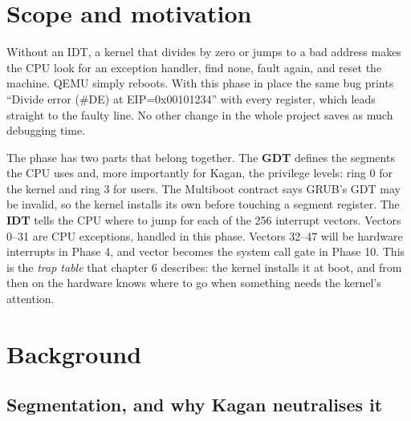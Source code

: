 \documentclass[11pt,a4paper]{article}
\begin{document}


\section{Scope and motivation}

Without an IDT, a kernel that divides by zero or jumps to a bad address makes the CPU look for an exception
handler, find none, fault again, and reset the machine. QEMU simply reboots. With this phase in place the same bug
prints ``Divide error (\#DE) at EIP=0x00101234'' with every register, which leads straight to the faulty line.
No other change in the whole project saves as much debugging time.

The phase has two parts that belong together. The \textbf{GDT} defines the segments the CPU uses and, more
importantly for Kagan, the privilege levels: ring 0 for the kernel and ring 3 for users. The Multiboot contract says
GRUB's GDT may be invalid, so the kernel installs its own before touching a segment register. The \textbf{IDT} tells
the CPU where to jump for each of the 256 interrupt vectors. Vectors 0--31 are CPU exceptions, handled in this phase.
Vectors 32--47 will be hardware interrupts in Phase 4, and vector  becomes the system call gate in
Phase 10. This is the \emph{trap table} that \OSTEP chapter 6 describes: the kernel installs it at boot, and from
then on the hardware knows where to go when something needs the kernel's attention.

\section{Background}

\subsection{Segmentation, and why Kagan neutralises it}
\end{document}
